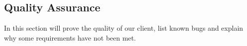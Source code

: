 \subsection{Quality Assurance}
In this section will prove the quality of our client, list known bugs and explain why some requirements have not been met.



\newpage